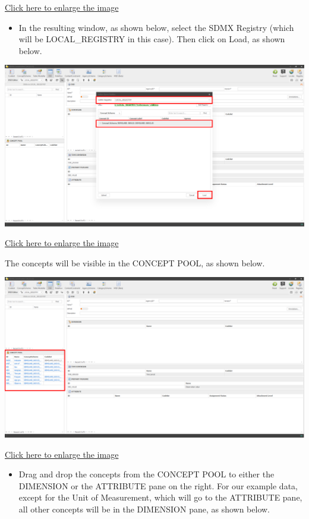 \documentclass[
]{book}
\providecommand{\tightlist}{%
  \setlength{\itemsep}{0pt}\setlength{\parskip}{0pt}}
\begin{document}
\href{images/image248.png}{Click here to enlarge the image}

\begin{itemize}
\tightlist
\item
  In the resulting window, as shown below, select the SDMX Registry (which will be LOCAL\_REGISTRY in this case). Then click on Load, as shown below.
\end{itemize}

\begin{center}\includegraphics[width=1\linewidth]{./images/image249} \end{center}

\href{images/image249.png}{Click here to enlarge the image}

The concepts will be visible in the CONCEPT POOL, as shown below.

\begin{center}\includegraphics[width=1\linewidth]{./images/image250} \end{center}

\href{images/image250.png}{Click here to enlarge the image}

\begin{itemize}
\tightlist
\item
  Drag and drop the concepts from the CONCEPT POOL to either the DIMENSION or the ATTRIBUTE pane on the right. For our example data, except for the Unit of Measurement, which will go to the ATTRIBUTE pane, all other concepts will be in the DIMENSION pane, as shown below.
\end{itemize}
\end{document}
